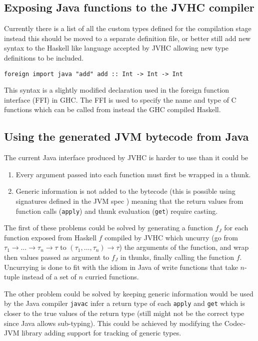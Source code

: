 \documentclass[float=false, crop=false]{standalone}
\begin{document}
\subsection{Exposing Java functions to the JVHC compiler}

Currently there is a list of all the custom types defined for the compilation stage
instead this should be moved to a separate definition file, or better still 
add new syntax to the Haskell like language accepted by JVHC allowing new type
definitions to be included.

\begin{verbatim}
foreign import java "add" add :: Int -> Int -> Int
\end{verbatim}

This syntax is a slightly modified declaration used in the foreign function interface (FFI) \cite{ghc_ffi} 
in GHC. The FFI is used to specify the name and type of C functions which can be called from 
instead the GHC compiled Haskell.

\subsection{Using the generated JVM bytecode from Java}

The current Java interface produced by JVHC is harder to use than it could be
\begin{enumerate}
  \item Every argument passed into each function must first be wrapped in a thunk. 
  \item Generic information is not added to the bytecode (this is possible using 
signatures defined in the JVM spec \cite[.9]{jvm-spec8}) meaning that
the return values from function calls (\texttt{apply}) and thunk evaluation (\texttt{get}) require casting.
\end{enumerate}

The first of these problems could be solved by generating a function $f_J$ for each 
function exposed from Haskell $f$ compiled by JVHC which uncurry 
(go from \mbox{$\tau_1 \rightarrow \dotsc \rightarrow \tau_n \rightarrow \tau$} to
\mbox{$(\tau_1,\dotsc,\tau_n) \rightarrow \tau$}) the arguments of the function, and 
wrap then values passed as argument to $f_J$ in thunks, finally calling the function $f$. 
Uncurrying is done to fit with the idiom in Java of write functions that take 
$n$-tuple instead of a set of $n$ curried functions. 

The other problem could be solved by keeping generic information would be used by 
the Java compiler \texttt{javac} infer a return type of each \texttt{apply} and \texttt{get}
which is closer to the true values of the return type (still might not be the correct type 
since Java allows sub-typing). This could be achieved by modifying the Codec-JVM library 
\cite{codec-jvm-link} adding support for tracking of generic types.
\end{document}
